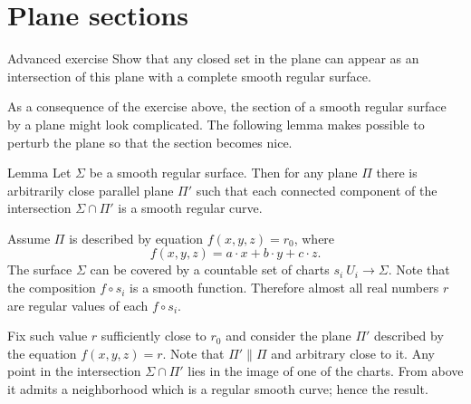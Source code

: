 \section*{Plane sections}

\begin{thm}{Advanced exercise}
Show that any closed set in the plane can appear as an intersection of this plane with a complete smooth regular surface.  
\end{thm}

As a consequence of the exercise above, the section of a smooth regular surface by a plane might look complicated.
The following lemma makes possible to perturb the plane so that the section becomes nice. 

\begin{thm}{Lemma}\label{lem:reg-section}
Let $\Sigma$ be a smooth regular surface.
Then for any plane $\Pi$ there is arbitrarily close parallel plane $\Pi'$ such that 
each connected component of the intersection $\Sigma\cap \Pi'$ is a smooth regular curve.
\end{thm}

Assume $\Pi$ is described by equation $f(x,y,z)=r_0$, where
\[f(x,y,z)=a\cdot x+b\cdot y+c\cdot z.\] 
The surface $\Sigma$ can be covered by a countable set of charts $s_i\:U_i\to \Sigma$.
Note that the composition $f\circ s_i$ is a smooth function.
Therefore almost all real numbers $r$ are regular values of each $f\circ s_i$.

Fix such value $r$ sufficiently close to $r_0$ and consider the plane $\Pi'$ described by the equation $f(x,y,z)=r$.
Note that $\Pi'\parallel \Pi$ and arbitrary close to it.
Any point in the intersection $\Sigma\cap\Pi'$ lies in the image of one of the charts.
From above it admits a neighborhood which is a regular smooth curve;
hence the result.\qeds


